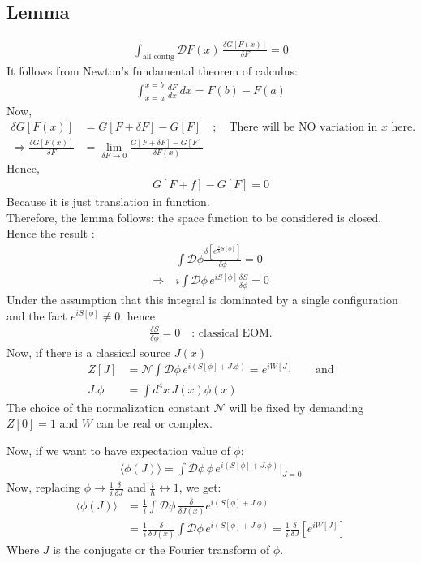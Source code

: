 \documentclass[14pt]{article} %
\begin{document}
{\subsection{Lemma}
\begin{align*}
    \int_{\text{all config}} \mathcal{D}F(x) \, \frac{\delta G[F(x)]}{\delta F} = 0
\end{align*}
It follows from Newton's fundamental theorem of calculus:
\begin{align*}
\int_{x=a}^{x=b} \frac{dF}{dx} \, dx = F(b) - F(a)
\end{align*}
Now,
\begin{align*}
\delta G[F(x)] &= G[F + \delta F] - G[F] \quad;\quad \text{There will be NO variation in $x$ here.} \\
\Rightarrow \frac{\delta G[F(x)]}{\delta F} 
&= \lim_{\delta F \to 0} \frac{G[F + \delta F] - G[F]}{\delta F(x)}
\end{align*}
Hence,
\begin{align*}
    G[F + f] - G[F] = 0
\end{align*}
Because it is just translation in function.\\
Therefore, the lemma follows: the space function to be considered is closed. \\
Hence the result :
\begin{align*}
&\int \mathcal{D}\phi \frac{\delta \left[ e^{\frac{i}{\hbar}S[\phi]} \right]}{\delta \phi} = 0 \\
\Rightarrow~ & i\int \mathcal{D}\phi \, e^{iS[\phi]} \frac{\delta S}{\delta \phi} = 0
\end{align*}
Under the assumption that this integral is dominated by a single configuration and the fact $e^{iS[\phi]} \neq 0$, hence
\begin{align*}
    \frac{\delta S}{\delta \phi} = 0 \quad \text{: classical EOM.}
\end{align*}
Now, if there is a classical source $J(x)$
\begin{align*}
    Z[J] &= \mathcal{N} \int \mathcal{D}\phi \, e^{i(S[\phi] + J. \phi)} = e^{iW[J]} \qquad \text{and} \\
    J. \phi &= \int d^4x \, J(x) \phi(x)
\end{align*}
The choice of the normalization constant $\mathcal{N}$ will be fixed by demanding $Z[0] = 1$ and $W$ can be real or complex.

Now, if we want to have expectation value of $\phi$:
\begin{align*}
    \langle \phi(J) \rangle = \int \mathcal{D}\phi \, \phi \, e^{i(S[\phi] + J. \phi)}\Big|_{J=0}
\end{align*}
Now, replacing $\phi \to \frac{1}{i} \frac{\delta}{\delta J}$ and $\frac{i}{\hbar} \longleftrightarrow 1$, we get:
\begin{align*}
\langle \phi(J) \rangle &=  \frac{1}{i}  \int \mathcal{D}\phi \,\frac{\delta}{\delta J(x)} e^{i(S[\phi] + J. \phi)} \\
&=\frac{1}{i} \frac{\delta}{\delta J(x)} \int \mathcal{D}\phi \, e^{i(S[\phi] + J. \phi)} = \frac{1}{i} \frac{\delta}{\delta J} \left[ e^{iW[J]} \right]
\end{align*}
Where $J$ is the conjugate or the Fourier transform of $\phi$.

}
\end{document}
